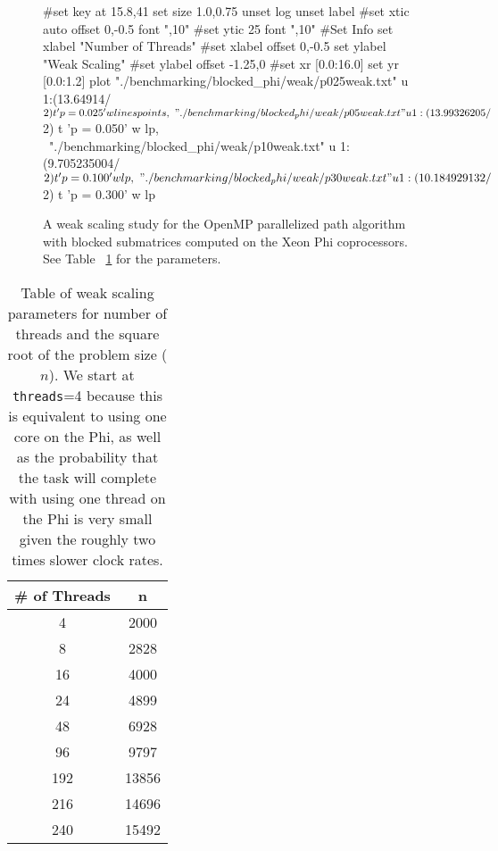 \documentclass[11pt]{article}
\begin{document}
\begin{figure}[h]
	\begin{center}
		\begin{gnuplot}[terminal=cairolatex, terminaloptions= color] 
			#set key at 15.8,41
			set size 1.0,0.75              
			unset log                          
			unset label                          
			#set xtic auto offset 0,-0.5 font ",10"                     
			#set ytic 25 font ",10" 
			#Set Info
			set xlabel "Number of Threads"
			#set xlabel offset 0,-0.5
			set ylabel "Weak Scaling"
			#set ylabel offset -1.25,0
			#set xr [0.0:16.0]
			set yr [0.0:1.2]
			plot "./benchmarking/blocked_phi/weak/p025weak.txt" u 1:(13.64914/$2) t 'p = 0.025' w linespoints, \
			"./benchmarking/blocked_phi/weak/p05weak.txt" u 1:(13.99326205/$2) t 'p = 0.050' w lp, \
			"./benchmarking/blocked_phi/weak/p10weak.txt" u 1:(9.705235004/$2) t 'p = 0.100' w lp, \
			"./benchmarking/blocked_phi/weak/p30weak.txt" u 1:(10.184929132/$2) t 'p = 0.300' w lp
		\end{gnuplot}
		\caption{A weak scaling study for the OpenMP parallelized path algorithm with blocked submatrices computed on the Xeon Phi coprocessors.  See Table ~\ref{phi_ws_tab} for the parameters.}
		\label{blocked_device_ws}
	\end{center}
\end{figure}
\begin{table}[h]
	\begin{center}
		\begin{tabular}{|c| c|}
			\hline
			\# of Threads & n \\ \hline
			4 & 2000 \\ \hline
			8 & 2828 \\ \hline
			16 & 4000 \\ \hline
			24 & 4899 \\ \hline
			48 & 6928\\ \hline
			96 & 9797\\ \hline
			192 & 13856\\ \hline
			216 & 14696\\ \hline
			240 & 15492\\ \hline
		\end{tabular}
	\end{center}
	\caption{Table of weak scaling parameters for number of threads and the square root of the problem size ($n$).  We start at \texttt{threads}=4 because this is equivalent to using one core on the Phi, as well as the probability that the task will complete with using one thread on the Phi is very small given the roughly two times slower clock rates.}
	\label{phi_ws_tab}
\end{table}
\end{document}
